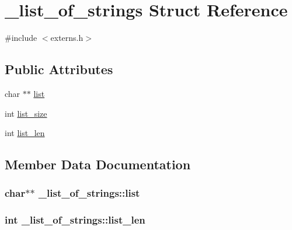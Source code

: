 \hypertarget{struct__list__of__strings}{}\section{\+\_\+list\+\_\+of\+\_\+strings Struct Reference}
\label{struct__list__of__strings}


{\ttfamily \#include $<$externs.\+h$>$}

\subsection*{Public Attributes}
\begin{DoxyCompactItemize}
\item 
char $\ast$$\ast$ \hyperlink{struct__list__of__strings_af27314272b184befee95f213b297dc21}{list}
\item 
int \hyperlink{struct__list__of__strings_ad48afe20c96c5b80e7fb6728bb1af3ad}{list\+\_\+size}
\item 
int \hyperlink{struct__list__of__strings_ae3747a3b406d21b7a9fe5ea10531e82a}{list\+\_\+len}
\end{DoxyCompactItemize}


\subsection{Member Data Documentation}
\subsubsection[{\texorpdfstring{list}{list}}]{\setlength{\rightskip}{0pt plus 5cm}char$\ast$$\ast$ \+\_\+list\+\_\+of\+\_\+strings\+::list}\hypertarget{struct__list__of__strings_af27314272b184befee95f213b297dc21}{}\label{struct__list__of__strings_af27314272b184befee95f213b297dc21}
\subsubsection[{\texorpdfstring{list\+\_\+len}{list_len}}]{\setlength{\rightskip}{0pt plus 5cm}int \+\_\+list\+\_\+of\+\_\+strings\+::list\+\_\+len}\hypertarget{struct__list__of__strings_ae3747a3b406d21b7a9fe5ea10531e82a}{}\label{struct__list__of__strings_ae3747a3b406d21b7a9fe5ea10531e82a}
